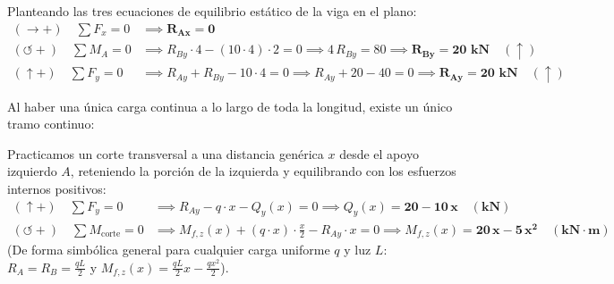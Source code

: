 {\begin{center}
{%
        }
    \end{center}

    Planteando las tres ecuaciones de equilibrio estático de la viga en el plano:
    \begin{align}
        (\rightarrow +) \quad \sum F_x = 0      & \implies \mathbf{R_{Ax} = 0}                                                                                                                    \\
        (\circlearrowleft +) \quad \sum M_A = 0 & \implies R_{By} \cdot 4 - (10 \cdot 4) \cdot 2 = 0 \implies 4\,R_{By} = 80 \implies \mathbf{R_{By} = 20\text{ kN}} \quad (\uparrow)           \\
        (\uparrow +) \quad \sum F_y = 0         & \implies R_{Ay} + R_{By} - 10 \cdot 4 = 0 \implies R_{Ay} + 20 - 40 = 0 \implies \mathbf{R_{Ay} = 20\text{ kN}} \quad (\uparrow)
    \end{align}


    Al haber una única carga continua a lo largo de toda la longitud, existe un único tramo continuo:


    Practicamos un corte transversal a una distancia genérica $x$ desde el apoyo izquierdo $A$, reteniendo la porción de la izquierda y equilibrando con los esfuerzos internos positivos:
    \begin{align}
        (\uparrow +) \quad \sum F_y = 0         & \implies R_{Ay} - q \cdot x - Q_y(x) = 0 \implies Q_y(x) = \mathbf{20 - 10\,x \quad (\text{kN})}                                              \\
        (\circlearrowleft +) \quad \sum M_{\text{corte}} = 0 & \implies M_{f,z}(x) + (q \cdot x) \cdot \frac{x}{2} - R_{Ay} \cdot x = 0 \implies M_{f,z}(x) = \mathbf{20\,x - 5\,x^2 \quad (\text{kN}\cdot\text{m})}
    \end{align}
    (De forma simbólica general para cualquier carga uniforme $q$ y luz $L$: $R_A = R_B = \frac{qL}{2}$ y $M_{f,z}(x) = \frac{qL}{2}x - \frac{qx^2}{2}$).

}
